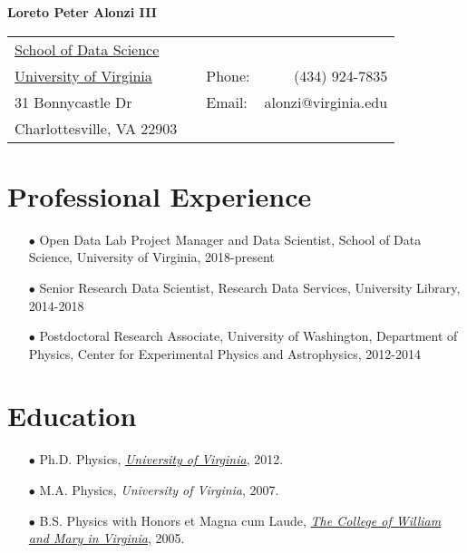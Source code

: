 \documentclass{article}[10pt]
\begin{document}
\begin{center}
{\LARGE \textbf{Loreto Peter Alonzi III} }

\vspace{0.5cm}

\begin{tabular}{lclr}
\hline
\hline
\href{https://datascience.virginia.edu/}{School of Data Science}         & \qquad \qquad &  &         \\
\href{virginia.edu}{University of Virginia}        & \qquad \qquad &Phone: &   (434) 924-7835      \\
31 Bonnycastle Dr              & \qquad \qquad & Email: & alonzi@virginia.edu \\
Charlottesville, VA 22903& \qquad \qquad &        &                     \\
\hline
\hline
\end{tabular}
\end{center}

\section*{Professional Experience}
\begin{itemize}
\item [$\bullet$] Open Data Lab Project Manager and Data Scientist, School of Data Science, University of Virginia, 2018-present
\item [$\bullet$] Senior Research Data Scientist, Research Data Services, University Library, 2014-2018
\item [$\bullet$] Postdoctoral Research Associate, University of Washington, Department of Physics, Center for Experimental Physics and Astrophysics, 2012-2014
\end{itemize}


\section*{Education}
\begin{itemize}
\item [$\bullet$] Ph.D. Physics, \href{http://www.phys.virginia.edu/}{\emph{University of Virginia}}, 2012.
\item [$\bullet$] M.A. Physics, \emph{University of Virginia}, 2007.
\item [$\bullet$] B.S. Physics with Honors et Magna cum Laude, \href{http://www.wm.edu/}{\emph{The College of William and Mary in Virginia}}, 2005.
\end{itemize}
\end{document}
